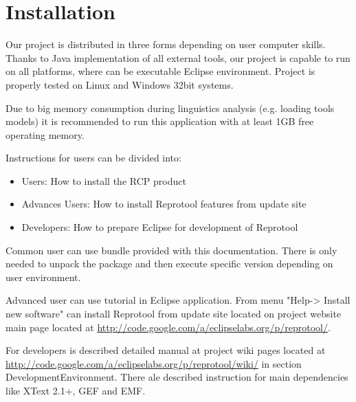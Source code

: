 \section{Installation}

Our project is distributed in three forms depending on user computer skills. Thanks to Java implementation of all external tools, our project is capable to run on all platforms, where can be executable Eclipse environment. Project is properly tested on Linux and Windows 32bit systems.

Due to big memory consumption during linguistics analysis (e.g. loading tools models) it is recommended to run this application with at least 1GB free operating memory.  

Instructions for users can be divided into:
\begin{itemize}
	\item Users: How to install the RCP product
	\item Advances Users: How to install Reprotool features from update site
	\item Developers: How to prepare Eclipse for development of Reprotool
\end{itemize}

Common user can use bundle provided with this documentation. There is only needed to unpack the package and then execute specific version depending on user environment.

Advanced user can use tutorial in Eclipse application. From menu "Help-> Install new software" can  install Reprotool from update site located on project website main page located at \href{http://code.google.com/a/eclipselabs.org/p/reprotool/}{http://code.google.com/a/eclipselabs.org/p/reprotool/}.

For developers is described detailed manual at project wiki pages  located at  \href{http://code.google.com/a/eclipselabs.org/p/reprotool/wiki/}{http://code.google.com/a/eclipselabs.org/p/reprotool/wiki/} in section DevelopmentEnvironment. There ale described instruction for main dependencies like XText 2.1+, GEF and EMF.


